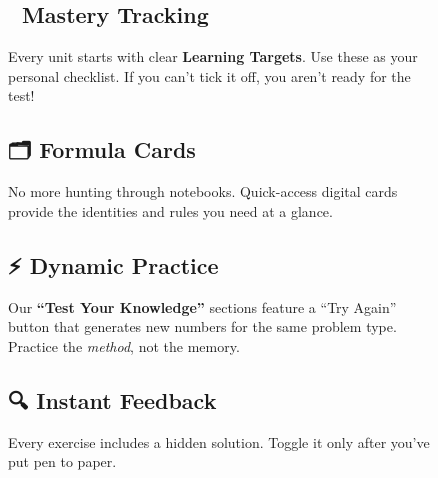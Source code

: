 \documentclass[
  letterpaper,
  DIV=11,
  numbers=noendperiod]{scrreprt}
\theoremstyle{definition}
\theoremstyle{remark}
\begin{document}
\begin{figure}

\begin{minipage}{0.50\linewidth}

\subsection*{🎯 Mastery Tracking}\label{mastery-tracking}

Every unit starts with clear \textbf{Learning Targets}. Use these as
your personal checklist. If you can't tick it off, you aren't ready for
the test!\end{minipage}%
%
\begin{minipage}{0.50\linewidth}

\subsection*{🗂️ Formula Cards}\label{formula-cards}

No more hunting through notebooks. Quick-access digital cards provide
the identities and rules you need at a glance.\end{minipage}%
\newline
\begin{minipage}{0.50\linewidth}

\subsection*{⚡ Dynamic Practice}\label{dynamic-practice}

Our \textbf{``Test Your Knowledge''} sections feature a ``Try Again''
button that generates new numbers for the same problem type. Practice
the \emph{method}, not the memory.\end{minipage}%
%
\begin{minipage}{0.50\linewidth}

\subsection*{🔍 Instant Feedback}\label{instant-feedback}

Every exercise includes a hidden solution. Toggle it only after you've
put pen to paper.\end{minipage}%

\end{figure}%
\end{document}
